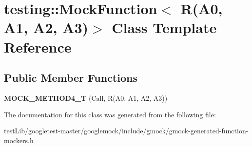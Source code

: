 \hypertarget{classtesting_1_1MockFunction_3_01R_07A0_00_01A1_00_01A2_00_01A3_08_4}{}\section{testing\+:\+:Mock\+Function$<$ R(A0, A1, A2, A3)$>$ Class Template Reference}
\label{classtesting_1_1MockFunction_3_01R_07A0_00_01A1_00_01A2_00_01A3_08_4}
\subsection*{Public Member Functions}
\begin{DoxyCompactItemize}
\item 
\mbox{\label{classtesting_1_1MockFunction_3_01R_07A0_00_01A1_00_01A2_00_01A3_08_4_ad158c25a1b33cb53bae3f0eb9df0d59c}} 
{\bfseries M\+O\+C\+K\+\_\+\+M\+E\+T\+H\+O\+D4\+\_\+T} (Call, R(A0, A1, A2, A3))
\end{DoxyCompactItemize}


The documentation for this class was generated from the following file\+:\begin{DoxyCompactItemize}
\item 
test\+Lib/googletest-\/master/googlemock/include/gmock/gmock-\/generated-\/function-\/mockers.\+h\end{DoxyCompactItemize}
